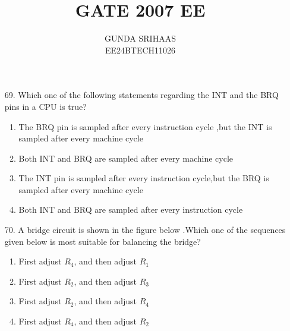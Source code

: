 \documentclass[journal,12pt,onecolumn]{IEEEtran}
\theoremstyle{remark}
\begin{document}

\vspace{3cm}

\title{GATE 2007 EE}
\author{GUNDA SRIHAAS \\ EE24BTECH11026}
\maketitle

\renewcommand{\thefigure}{\theenumi}
\renewcommand{\thetable}{\theenumi}

\begin{enumerate}
    \item[69.]
     Which one of the following statements regarding the INT  and the BRQ   pins in a CPU is true?
              \begin{enumerate}
              
                \item The BRQ pin is sampled after every instruction cycle ,but the INT is sampled after every machine cycle  
                \item Both INT and BRQ are sampled after every machine cycle                 
                \item The INT pin is sampled after every instruction cycle,but the BRQ is sampled after every machine cycle             
                \item Both INT and BRQ are sampled after every instruction cycle   
                
            \end{enumerate}
       
	\item [70.] A bridge circuit is shown in the figure below .Which one of the sequences given below is most suitable for balancing the bridge?
\begin{figure}[H]
\centering
\resizebox{0.6\textwidth}{!}{}
\end{figure}

        \begin{enumerate}    
                \item First adjust $R_4$, and then adjust $R_1$
                \item First adjust $R_2$, and then adjust $R_3$
                \item First adjust $R_2$, and then adjust $R_4$
                \item First adjust $R_4$, and then adjust $R_2$
       \end{enumerate}

\end{enumerate}
\end{document}
